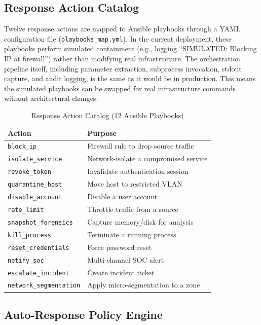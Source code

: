 \documentclass[conference,10pt]{IEEEtran}
\begin{document}
\subsection{Response Action Catalog}

Twelve response actions are mapped to Ansible playbooks through a YAML configuration file (\texttt{playbooks\_map.yml}). In the current deployment, these playbooks perform simulated containment (e.g., logging ``SIMULATED: Blocking IP at firewall'') rather than modifying real infrastructure. The orchestration pipeline itself, including parameter extraction, subprocess invocation, stdout capture, and audit logging, is the same as it would be in production. This means the simulated playbooks can be swapped for real infrastructure commands without architectural changes.

\begin{table}[t]
\centering
\caption{Response Action Catalog (12 Ansible Playbooks)}
\label{tab:response_actions}
\begin{tabular}{l l}
\toprule
\textbf{Action} & \textbf{Purpose} \\
\midrule
\texttt{block\_ip} & Firewall rule to drop source traffic \\
\texttt{isolate\_service} & Network-isolate a compromised service \\
\texttt{revoke\_token} & Invalidate authentication session \\
\texttt{quarantine\_host} & Move host to restricted VLAN \\
\texttt{disable\_account} & Disable a user account \\
\texttt{rate\_limit} & Throttle traffic from a source \\
\texttt{snapshot\_forensics} & Capture memory/disk for analysis \\
\texttt{kill\_process} & Terminate a running process \\
\texttt{reset\_credentials} & Force password reset \\
\texttt{notify\_soc} & Multi-channel SOC alert \\
\texttt{escalate\_incident} & Create incident ticket \\
\texttt{network\_segmentation} & Apply micro-segmentation to a zone \\
\bottomrule
\end{tabular}
\end{table}

\subsection{Auto-Response Policy Engine}
\end{document}
